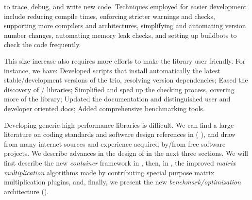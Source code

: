 to trace, debug, and write new code. Techniques employed
for easier development include reducing
compile times, enforcing stricter warnings and checks, supporting more
compilers and architectures, simplifying and automating version number
changes, automating memory leak checks, and setting up buildbots to check the code
frequently.
%
\par
%
This size increase also requires more efforts to make the library user friendly. For
instance, we have:
%
Developed %
scripts that install automatically the
latest stable/development versions of the trio, resolving version
dependencies;
%
Eased the discovery of \blas/ libraries;
%
Simplified and sped up the checking process, covering more of the library;
%
Updated the documentation and distinguished user and developer oriented docs;
%
Added comprehensive benchmarking tools.
%
%
\par
%
Developing generic high performance libraries is difficult. We can find a
large literature on coding standards and software design references in (\cf{}
\cite{alexandrescu:01:modern,gamma:95:design,sutter:05:cpp,stroustrup1994design,Douglas:05:GPHP}),
and draw from many internet sources and experience acquired by/from free
software projects.
%
%
We describe advances in the design of \linbox in the next
three sections. We will first describe the new \emph{container} framework in
, then,
in ,
the improved \emph{matrix multiplication} algorithms
made by contributing special purpose matrix multiplication plugins, and, finally, we present the new \emph{benchmark/optimization}
architecture ().
%
\par
